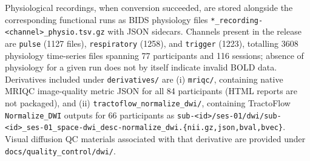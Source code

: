 Physiological recordings, when conversion succeeded, are stored alongside the corresponding functional runs as BIDS physiology files \texttt{*\_recording-<channel>\_physio.tsv.gz} with JSON sidecars. Channels present in the release are \texttt{pulse} (1127 files), \texttt{respiratory} (1258), and \texttt{trigger} (1223), totalling 3608 physiology time-series files spanning 77 participants and 116 sessions; absence of physiology for a given run does not by itself indicate invalid BOLD data. Derivatives included under \texttt{derivatives/} are (i) \texttt{mriqc/}, containing native MRIQC image-quality metric JSON for all 84 participants (HTML reports are not packaged), and (ii) \texttt{tractoflow\_normalize\_dwi/}, containing TractoFlow \texttt{Normalize\_DWI} outputs for 66 participants as \texttt{sub-<id>/ses-01/dwi/sub-<id>\_ses-01\_space-dwi\_desc-normalize\_dwi.\{nii.gz,json,bval,bvec\}}. Visual diffusion QC materials associated with that derivative are provided under \texttt{docs/quality\_control/dwi/}.
